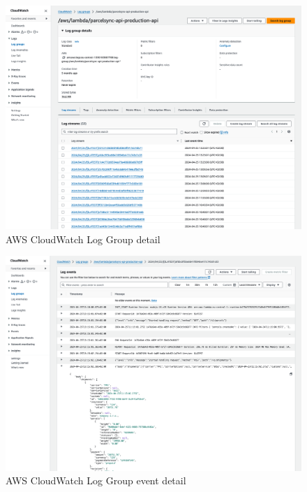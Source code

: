 \begin{figure}[H]\centering
\includegraphics[width=140mm]{img/docs/fig_aws_loggroup.png}
\caption{AWS CloudWatch Log Group detail}
\label{img:admin-manual-aws.lambda.log.detail}
\end{figure}

\begin{figure}[H]\centering
\includegraphics[width=140mm]{img/docs/fig_aws_log_event.png}
\caption{AWS CloudWatch Log Group event detail}
\label{img:admin-manual-aws.lambda.log.event.detail}
\end{figure}

